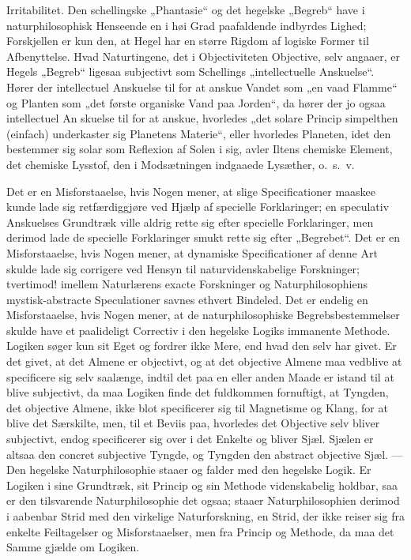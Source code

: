 \documentclass[12pt]{book}
\newcommand{\opage}[1]{\marginnote{\footnotesize\textit{[#1]}}}
\newcommand{\apage}[1]{\marginnote{\footnotesize\textit{[#1]}}}
\begin{document}
Irritabilitet. Den schellingske „Phantasie“ og det hegelske „Begreb“ have i
naturphilosophisk Henseende en i høi Grad paafaldende indbyrdes Lighed; Forskjellen er kun
den, at Hegel har en større Rigdom af logiske Former til Afbenyttelse. Hvad Naturtingene,
det i Objectiviteten Objective, selv angaaer, er Hegels „Begreb“ ligesaa subjectivt som
Schellings „intellectuelle Anskuelse“. Hører der intellectuel Anskuelse til for at anskue
Vandet som „en vaad Flamme“ og Planten som „det første organiske Vand paa Jorden“, da hører
der jo ogsaa intellectuel \apage{360} An\-%
skuelse til for at anskue, hvorledes „det solare Princip simpelthen (einfach) underkaster
sig Planetens Materie“, eller hvorledes Planeten, idet den bestemmer sig solar som Reflexion
af Solen i sig, avler Iltens chemiske Element, det chemiske Lysstof, den i Modsætningen
indgaaede Lysæther, o.\ s.\ v.

Det er en Misforstaaelse, hvis Nogen mener, at slige Specificationer maaskee kunde lade sig
retfærdiggjøre ved Hjælp af specielle Forklaringer; en speculativ Anskuelses Grundtræk ville
aldrig rette sig efter specielle Forklaringer, men derimod lade de specielle Forklaringer
smukt rette sig efter „Begrebet“. Det er en Misforstaaelse, hvis Nogen mener, at dynamiske
Specificationer af denne Art skulde lade sig corrigere ved Hensyn til naturvidenskabelige
Forskninger; tvertimod! imellem Naturlærens exacte Forskninger og Naturphilosophiens
mystisk-abstracte Speculationer savnes ethvert Bindeled. Det er endelig en Misforstaaelse,
hvis Nogen mener, at de naturphilosophiske Begrebsbestemmelser skulde have et paalideligt
Correctiv i den hegelske Logiks immanente Methode. Logiken søger kun sit Eget og fordrer
ikke Mere, end hvad den selv har givet. Er det givet, at det Almene er objectivt, og at det
objective Almene maa vedblive at specificere sig selv saalænge, indtil det paa en eller
anden Maade er istand til at blive subjectivt, da maa Logiken finde det fuldkommen
fornuftigt, at Tyngden, det objective Almene, ikke blot specificerer sig til Magnetisme og
Klang, for at blive det Særskilte, men, til et Beviis paa, hvorledes det Objective selv
bliver subjectivt, endog specificerer sig over i det Enkelte og bliver Sjæl. Sjælen er
altsaa den concret subjective Tyngde, og Tyngden den abstract objective Sjæl. — Den
hegelske Naturphilosophie staaer og falder med den hegelske Logik. Er Logiken i sine
Grundtræk, sit Princip og sin Methode videnskabelig holdbar, saa er den tilsvarende
Naturphilosophie det ogsaa; staaer Naturphilosophien derimod i aabenbar Strid med den
virkelige Naturforskning, en Strid, der ikke reiser
\opage{361} sig fra enkelte Feiltagelser og Misforstaaelser, men fra Princip og Methode, da maa det
Samme gjælde om Logiken.
\end{document}
